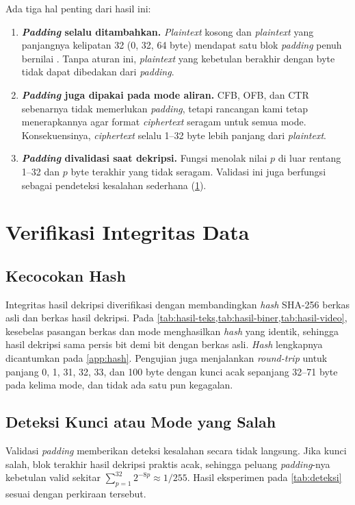 Ada tiga hal penting dari hasil ini:
\begin{enumerate}
    \item \textbf{\textit{Padding} selalu ditambahkan.} \textit{Plaintext} kosong dan \textit{plaintext} yang panjangnya kelipatan 32 (0, 32, 64 byte) mendapat satu blok \textit{padding} penuh bernilai . Tanpa aturan ini, \textit{plaintext} yang kebetulan berakhir dengan byte  tidak dapat dibedakan dari \textit{padding}.
    \item \textbf{\textit{Padding} juga dipakai pada mode aliran.} CFB, OFB, dan CTR sebenarnya tidak memerlukan \textit{padding}, tetapi rancangan kami tetap menerapkannya agar format \textit{ciphertext} seragam untuk semua mode. Konsekuensinya, \textit{ciphertext} selalu 1--32 byte lebih panjang dari \textit{plaintext}.
    \item \textbf{\textit{Padding} divalidasi saat dekripsi.} Fungsi  menolak nilai $p$ di luar rentang 1--32 dan $p$ byte terakhir yang tidak seragam. Validasi ini juga berfungsi sebagai pendeteksi kesalahan sederhana (\cref{sec:integritas}).
\end{enumerate}

\section{Verifikasi Integritas Data}
\label{sec:integritas}

\subsection{Kecocokan Hash}
Integritas hasil dekripsi diverifikasi dengan membandingkan \textit{hash} SHA-256 berkas asli dan berkas hasil dekripsi. Pada \cref{tab:hasil-teks,tab:hasil-biner,tab:hasil-video}, kesebelas pasangan berkas dan mode menghasilkan \textit{hash} yang identik, sehingga hasil dekripsi sama persis bit demi bit dengan berkas asli. \textit{Hash} lengkapnya dicantumkan pada \cref{app:hash}. Pengujian  juga menjalankan \textit{round-trip} untuk panjang 0, 1, 31, 32, 33, dan 100 byte dengan kunci acak sepanjang 32--71 byte pada kelima mode, dan tidak ada satu pun kegagalan.

\subsection{Deteksi Kunci atau Mode yang Salah}
Validasi \textit{padding} memberikan deteksi kesalahan secara tidak langsung. Jika kunci salah, blok terakhir hasil dekripsi praktis acak, sehingga peluang \textit{padding}-nya kebetulan valid sekitar $\sum_{p=1}^{32} 2^{-8p} \approx 1/255$. Hasil eksperimen pada \cref{tab:deteksi} sesuai dengan perkiraan tersebut.

